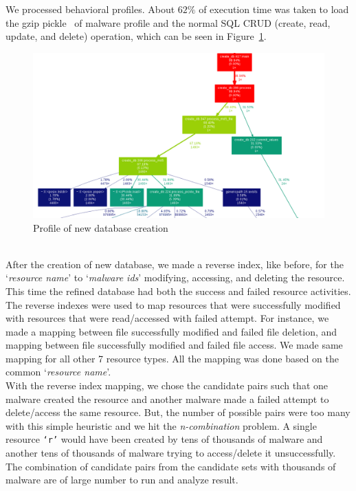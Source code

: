 We processed \gettotalmalwareii{} behavioral profiles.
About $62\%$ of execution time was taken to load the gzip pickle~\cite[]{pythonpickle} of malware profile and the normal SQL CRUD (create, read, update, and delete) operation, which can be seen in Figure~\ref{fig:dbcreation}.
\begin{figure}
\begin{center}
  \includegraphics[scale=0.4]{figures/db_create2.png}
\end{center}
\caption{Profile of new database creation}
\label{fig:dbcreation}
\end{figure}
\\
After the creation of new database, we made a reverse index, like before, for the `\emph{resource name}' to `\emph{malware ids}' modifying, accessing, and deleting the resource.
This time the refined database had both the success and failed resource activities.
The reverse indexes were used to map resources that were successfully modified with resources that were read/accessed with failed attempt.
For instance, we made a mapping between file successfully modified and failed file deletion, and mapping between file successfully modified and failed file access.
We made same mapping for all other 7 resource types.
All the mapping was done based on the common `\emph{resource name}'.\\

With the reverse index mapping, we chose the candidate pairs such that one malware created the resource and another malware made a failed attempt to delete/access the same resource.
But, the number of possible pairs were too many with this simple heuristic and we hit the \emph{n-combination} problem.
A single resource \texttt{`r'} would have been created by tens of thousands of malware and another tens of thousands of malware trying to access/delete it unsuccessfully.
The combination of candidate pairs from the candidate sets with thousands of malware are of large number to run and analyze result.\\

